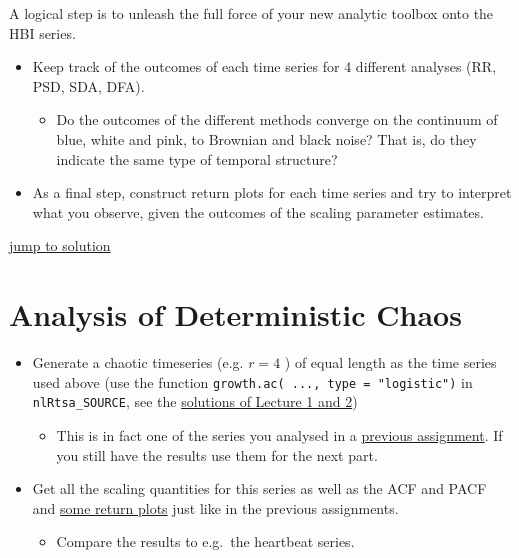 \documentclass[]{book}
\providecommand{\tightlist}{%
  \setlength{\itemsep}{0pt}\setlength{\parskip}{0pt}}
\let\stdsection\section
\renewcommand\section{\newpage\stdsection}
\begin{document}
A logical step is to unleash the full force of your new analytic toolbox
onto the HBI series.

\begin{itemize}
\tightlist
\item
  Keep track of the outcomes of each time series for 4 different
  analyses (RR, PSD, SDA, DFA).

  \begin{itemize}
  \tightlist
  \item
    Do the outcomes of the different methods converge on the continuum
    of blue, white and pink, to Brownian and black noise? That is, do
    they indicate the same type of temporal structure?
  \end{itemize}
\item
  As a final step, construct return plots for each time series and try
  to interpret what you observe, given the outcomes of the scaling
  parameter estimates.
\end{itemize}

\protect\hyperlink{hrv2sol}{\textbar{} jump to solution \textbar{}}

\section{Analysis of Deterministic Chaos}\label{chaos}

\begin{itemize}
\tightlist
\item
  Generate a chaotic timeseries (e.g. \(r = 4\) ) of equal length as the
  time series used above (use the function
  \texttt{growth.ac(\ ...,\ type\ =\ "logistic")} in
  \texttt{nlRtsa\_SOURCE}, see the
  \protect\hyperlink{linear-and-logistic-growth}{solutions of Lecture 1
  and 2})

  \begin{itemize}
  \tightlist
  \item
    This is in fact one of the series you analysed in a
    \protect\hyperlink{pacf}{previous assignment}. If you still have the
    results use them for the next part.
  \end{itemize}
\item
  Get all the scaling quantities for this series as well as the ACF and
  PACF and \protect\hyperlink{the-return-plot}{some return plots} just
  like in the previous assignments.

  \begin{itemize}
  \tightlist
  \item
    Compare the results to e.g.~the heartbeat series.
  \end{itemize}
\end{itemize}
\end{document}
